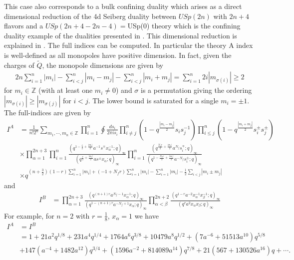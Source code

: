 \documentclass[12pt]{article}
\newcommand{\Zb}{\mathbb{Z}}
\numberwithin{equation}{section}
\begin{document}
This case also corresponds to a bulk confining duality which
arises as a direct dimensional reduction of the 4d Seiberg duality between $USp(2n)$
with $2n + 4$ flavors and a $USp(2n + 4 - 2n - 4) = $USp(0) theory which is the confining duality example of the dualities presented in \cite{Intriligator:1995ne}. This dimensional
reduction is explained in \cite{Aharony:2013dha}.
The full indices can be computed. In particular the theory A index is well-defined as all monopoles have positive dimension. In fact, given the charges of $\tilde{Q}$, the monopole dimensions are given by
\begin{align}
\label{Mono_Ch_usp2n_2np3p1}
    2n \sum_{i=1}^n |m_i| - \sum_{i < j}^n |m_i - m_j| - \sum_{i < j}^n |m_i + m_j| = \sum_{i=1}^n 2i |m_{\sigma(i)}| \ge 2
\end{align}
for $m_i \in \Zb$ (with at least one $m_i \ne 0$) and $\sigma$ is a permutation giving the ordering $|m_{\sigma(i)}| \ge |m_{\sigma(j)}|$ for $i < j$. The lower bound is saturated for a single $m_i = \pm 1$.
The full-indices are given by
\begin{align}
\label{usp2n_2np3p1_fullA}
I^A&=\frac{1}{n!2^n}
\sum_{m_1,\cdots,m_n\in \mathbb{Z}}
\prod_{i=1}^n
\oint \frac{ds_i}{2\pi i s_i}
\prod_{i\neq j}^n (1-q^{\frac{|m_i-m_j|}{2}}s_i s_j^{-1})
\prod_{i\le j}^{n} (1-q^{\frac{|m_i+m_j|}{2}}s_i^{\pm} s_j^{\pm})
\nonumber\\
&\times 
\prod_{\alpha=1}^{2n+3}
\prod_{i=1}^{n}
\frac{(q^{1-\frac{r}{2}+\frac{|m_i|}{2}} a^{-1} s^{\mp} x_{\alpha}^{-1};q )_{\infty}}
{(q^{\frac{r}{2}+\frac{|m_i|}{2}}as^{\pm}x_{\alpha};q)_{\infty}}
\prod_{i=1}^n 
\frac{
(q^{\frac{N_f r}{2}+\frac{|m_i|}{2}}a^{N_f}s_i^{\mp};q)_{\infty}
}
{
(q^{1-\frac{N_f r}{2}+\frac{|m_i|}{2}}a^{-N_f}s_i^{\pm};q)_{\infty}
}
\nonumber\\
&\times 
q^{(n+\frac32)(1-r)\sum_{i=1}^n |m_i|+(-1+N_f r)\sum_{i=1}^n |m_i|
-\sum_{i=1}^n |m_i|-\frac12\sum_{i<j}|m_i\pm m_j|}
\end{align}
and
\begin{align}
\label{usp2n_2np3p1_fullB}
I^B&=
\prod_{\alpha=1}^{2n+3}
\frac{
(q^{(n+1)r}a^{N_f-1}x_{\alpha}^{-1};q)_{\infty}
}
{
(q^{1-(n+1)r}a^{-N_f+1}x_{\alpha};q)_{\infty}
}
\prod_{\alpha<\beta}^{2n+2}
\frac{
(q^{1-r} a^{-2}x_{\alpha}^{-1}x_{\beta}^{-1};q)_{\infty}
}{
(q^{r} a^{2} x_{\alpha}x_{\beta};q)_{\infty}
}
\end{align}
For example, for $n=2$ with $r=\frac18$, $x_{\alpha}=1$ we have
\begin{align}
I^A&=I^B
\nonumber\\
&=1+21a^2q^{1/8}+231a^4q^{1/4}
+1764a^6q^{3/8}+10479a^{8}q^{1/2}
+(7a^{-6}+51513a^{10})q^{5/8}
\nonumber\\
&+147(a^{-4}+1482a^{12})q^{3/4}
+(1596a^{-2}+814089a^{14})q^{7/8}
+21(567+130526a^{16})q+\cdots.
\end{align}
\end{document}
